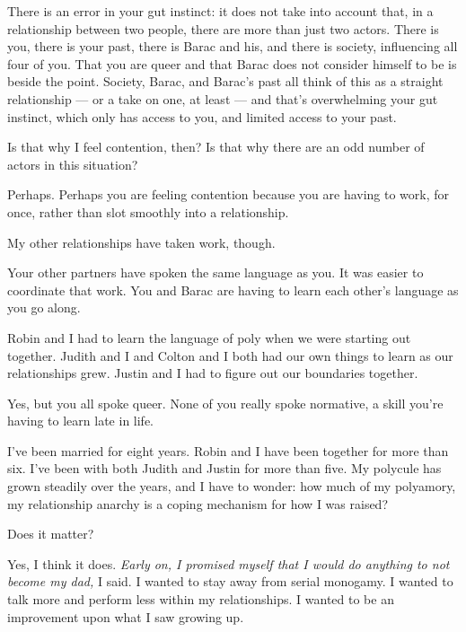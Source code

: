 \begin{paracol}{2}
\begin{leftcolumn}
\begin{ally}
There is an error in your gut instinct: it does not take into account that, in a relationship between two people, there are more than just two actors. There is you, there is your past, there is Barac and his, and there is society, influencing all four of you. That you are queer and that Barac does not consider himself to be is beside the point. Society, Barac, and Barac's past all think of this as a straight relationship --- or a take on one, at least --- and that's overwhelming your gut instinct, which only has access to you, and limited access to your past.
\end{ally}
Is that why I feel contention, then? Is that why there are an odd number of actors in this situation?

\begin{ally}
Perhaps. Perhaps you are feeling contention because you are having to work, for once, rather than slot smoothly into a relationship.
\end{ally}
My other relationships have taken work, though.

\begin{ally}
Your other partners have spoken the same language as you. It was easier to coordinate that work. You and Barac are having to learn each other's language as you go along.
\end{ally}
Robin and I had to learn the language of poly when we were starting out together. Judith and I and Colton and I both had our own things to learn as our relationships grew. Justin and I had to figure out our boundaries together.

\begin{ally}
Yes, but you all spoke queer. None of you really spoke normative, a skill you're having to learn late in life.
\end{ally}
\newpage

\noindent I've been married for eight years. Robin and I have been together for more than six. I've been with both Judith and Justin for more than five. My polycule has grown steadily over the years, and I have to wonder: how much of my polyamory, my relationship anarchy is a coping mechanism for how I was raised?

\begin{ally}
Does it matter?
\end{ally}
Yes, I think it does. \emph{Early on, I promised myself that I would do anything to not become my dad,} I said. I wanted to stay away from serial monogamy. I wanted to talk more and perform less within my relationships. I wanted to be an improvement upon what I saw growing up.


\end{leftcolumn}
\end{paracol}
